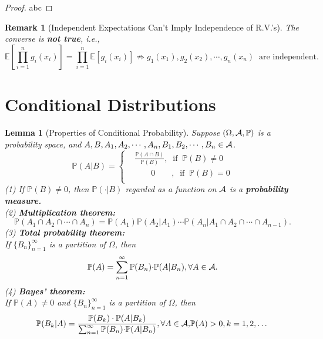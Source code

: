 \documentclass[openany,12pt]{book}
\newtheorem{remark}{Remark}[chapter]
\newtheorem{lemma}{Lemma}[chapter]
\begin{document}
\begin{proof}
  abc
\end{proof}

\begin{remark}[Independent Expectations Can't Imply Independence of R.V.'s]
  The converse is \textbf{not true}, i.e.,
  \[\mathbb{E}\left[ \prod_{i = 1}^{n}{g_{i}(x_{i})} \right] = \prod_{i = 1}^{n}{\mathbb{E}[ g_{i}(x_{i})]} \nRightarrow g_{1}(x_{1}), g_{2}(x_{2}), \cdots, g_{n}(x_{n})~\text{ are independent.}~\]
\end{remark}

\section{Conditional Distributions}

\begin{lemma}[Properties of Conditional Probability]
  Suppose $(\Omega,\mathcal{A},\mathbb{P})$ is a probability space, and $A,B,A_{1},A_{2}, \cdots,A_{n},B_{1},B_{2}, \cdots,B_{n} \in \mathcal{A}$.
  \[\mathbb{P}( A | B)= \left\{ \begin{aligned}
       & \frac{\mathbb{P}(A  \cap B)}{\mathbb{P}(B)},~\text{ if }~\mathbb{P}( B) \neq 0 \\
       & \qquad0\qquad,~\text{ if }~\mathbb{P}( B)= 0                                  \\
    \end{aligned} \right.\]
  (1) If $\mathbb{P}(B) \neq 0$, then $\mathbb{P}(\cdot | B)$ regarded as a function on $\mathcal{A}$ is a \textbf{probability} \textbf{measure.}\\
  (2) \textbf{Multiplication theorem:}
  \[\mathbb{P}( A_{1}\cap{A_{2}\cap{\cdots\cap A_{n}}})= \mathbb{P}( A_{1})\mathbb{P}( A_{2} | A_{1}) \cdots \mathbb{P}(A_{n}|A_{1}\cap{A_{2}\cap{  \cdots\cap A_{n - 1}}}).\]
  (3) \textbf{Total probability theorem:}\\
  If ${\{ B_{n}\}}_{n = 1}^{\infty}$ is a partition of $\Omega$, then
  \[\mathbb{P}(A)= \sum_{n = 1}^{\infty}{\mathbb{P}(B_{n}) \cdot}\mathbb{P}(A|B_{n}),\forall A \in \mathcal{A}.\]
  (4) \textbf{Bayes' theorem:}\\
  If $\mathbb{P}(A) \neq 0$ and ${\{ B_{n}\}}_{n = 1}^{\infty}$ is
  a partition of $\Omega$, then
  \[\mathbb{P}(B_{k} | A)= \frac{\mathbb{P}(B_{k}) \cdot \mathbb{P}(A|B_{k})}{\sum_{n = 1}^{\infty}{\mathbb{P}(B_{n}) \cdot}\mathbb{P}( A | B_{n})}, \forall A \in \mathcal{A}\mathrm{, }\mathbb{P}(A) > 0, k = 1,2,\dots\]
\end{lemma}
\end{document}
